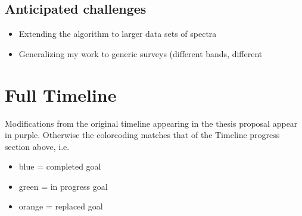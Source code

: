 \documentclass[11pt]{article}
\begin{document}
    \subsection*{Anticipated challenges}
    \begin{itemize}
    	\item Extending the algorithm to larger data sets of spectra
    	\item Generalizing my work to generic surveys (different bands, different 
    \end{itemize}

    

\section*{Full Timeline}

Modifications from the original timeline appearing in the thesis proposal appear in {\color{Mulberry} purple}. Otherwise the colorcoding matches that of the Timeline progress section above, i.e.
    
    \begin{itemize}
    	\item {\color{RoyalBlue}blue} = completed goal
    	\item {\color{ForestGreen} green} = in progress goal
    	\item {\color{BurntOrange} orange} = replaced goal
    \end{itemize}
\end{document}
